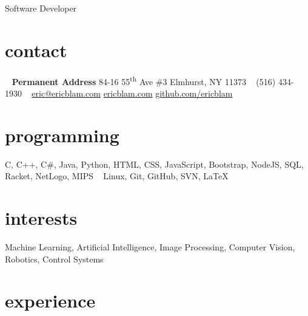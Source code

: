 \documentclass[]{friggeri-cv}
\begin{document}
       {Software Developer}


\begin{aside}
  \section{contact}
    ~
    \textbf{Permanent Address}
    84-16 55\textsuperscript{th} Ave
    \#3
    Elmhurst, NY 11373
    ~
    (516) 434-1930
    ~
    \href{mailto:adrien@friggeri.net}{eric@ericblam.com}
    \href{http://ericblam.com}{ericblam.com}
    \href{http://github.com/ericblam}{github.com/ericblam}
  \section{programming}
    C, C++, C\#, Java, Python, HTML, CSS, JavaScript, Bootstrap, NodeJS, SQL, Racket, NetLogo, MIPS
    ~
    Linux, Git, GitHub, SVN, \LaTeX
\end{aside}

\section{interests}

Machine Learning, Artificial Intelligence, Image Processing, Computer Vision, Robotics, Control Systems

\section{experience}
\end{document}
